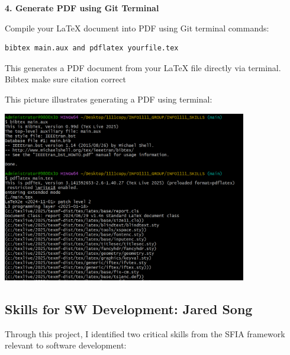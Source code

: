 \documentclass[a4paper, 11pt]{report}
\begin{document}
\textbf{4. Generate PDF using Git Terminal}

Compile your LaTeX document into PDF using Git terminal commands:

\begin{verbatim}
bibtex main.aux and pdflatex yourfile.tex
\end{verbatim}

This generates a PDF document from your LaTeX file directly via terminal. Bibtex make sure citation correct

This picture illustrates generating a PDF using terminal:

\begin{center}
\includegraphics[width=0.8\textwidth]{kaffa/forpdf.png}
\end{center}






\newpage

\subsection{Skills for SW Development: Jared Song}
Through this project, I identified two critical skills from the SFIA framework relevant to software development:
\end{document}
